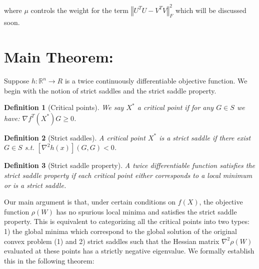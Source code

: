\documentclass{article}
\newtheorem{definition}{Definition}
\begin{document}
where $\mu$ controls the weight for the term $\left\Vert U^TU-V^TV\right\Vert^2_F$ which will be discussed soon.

\section{Main Theorem:}

Suppose $h:\mathbb{R}^n\rightarrow R$ is a twice continuously differentiable objective function. We begin with the notion of strict saddles and the strict saddle property.

\begin{definition}[Critical points]
We say $X^*$ a critical point if for any $G\in S$ we have: $\nabla f^{T}\left(X^{*}\right)G\ge0$.
\end{definition}

\begin{definition}[Strict saddles]
A critical point $X^*$ is a strict saddle if there exist $G\in S$ s.t. $\left[\nabla^2 h\left(x\right)\right]\left(G,G\right) < 0$.
\end{definition}

\begin{definition}[Strict saddle property]
A twice differentiable function satisfies the strict saddle property if each critical point either corresponds to a local minimum or is a strict saddle.
\end{definition}

Our main argument is that, under certain conditions on $f(X)$, the objective function $\rho(W)$ has no spurious local minima and satisfies the strict saddle property. This is equivalent to categorizing all the critical points into two types: 1) the global minima which correspond to the global solution of the original convex problem (1) and 2) strict saddles such that the Hessian matrix $\nabla^2\rho\left(W\right)$ evaluated at these points has a strictly negative eigenvalue. We formally establish this in the following theorem:
\end{document}
